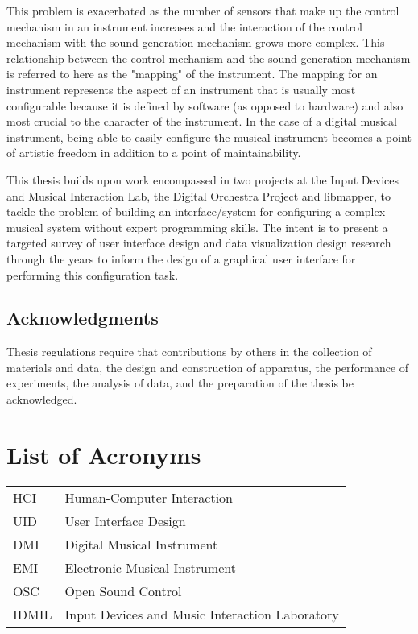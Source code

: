 \documentclass [12pt,letterpaper]{report}
\begin{document}
This problem is exacerbated as the number of sensors that make up the control mechanism in an instrument increases and the interaction of the control mechanism with the sound generation mechanism grows more complex. This relationship between the control mechanism and the sound generation mechanism is referred to here as the "mapping" of the instrument. The mapping for an instrument represents the aspect of an instrument that is usually most configurable because it is defined by software (as opposed to hardware) and also most crucial to the character of the instrument. In the case of a digital musical instrument, being able to easily configure the musical instrument becomes a point of artistic freedom in addition to a point of maintainability.

This thesis builds upon work encompassed in two projects at the Input Devices and Musical Interaction Lab, the Digital Orchestra Project and libmapper, to tackle the problem of building an interface/system for configuring a complex musical system without expert programming skills. The intent is to present a targeted survey of user interface design and data visualization design research through the years to inform the design of a graphical user interface for performing this configuration task.

\newpage

\section*{\centering Acknowledgments}

Thesis regulations require that contributions by others in the collection of
 materials and data, the design and construction of apparatus, the performance
 of experiments, the analysis of data, and the preparation of the thesis be
 acknowledged.

\tableofcontents
\listoffigures
\listoftables

\newpage
\chapter*{List of Acronyms}

\begin{longtable}{ll}
  HCI		&	Human-Computer Interaction\\
  UID		&	User Interface Design\\
  DMI		&	Digital Musical Instrument\\
  EMI		&	Electronic Musical Instrument\\
  OSC	&	Open Sound Control\\
  IDMIL	&	Input Devices and Music Interaction Laboratory\\
\end{longtable}
\end{document}
